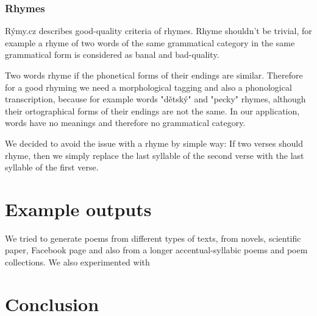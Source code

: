 \documentclass[a4]{article}
\begin{document}
\subsubsection{Rhymes}


Rýmy.cz\cite{rymy} describes good-quality criteria of rhymes. Rhyme
shouldn't be trivial, for example a rhyme of two words of the same
grammatical category in the same grammatical form is considered as banal
and bad-quality.

Two words rhyme if the phonetical forms of their endings are similar. 
Therefore for a good rhyming we need a morphological tagging and
also a phonological transcription, because for example words "dětský" and
"pecky" rhymes, although their ortographical forms of their endings are not
the same. In our application, words have no meanings and
therefore no grammatical category.

We decided to avoid the issue with a rhyme by simple way:
If two verses should rhyme, then we simply replace the last syllable of the
second verse with the last syllable of the first verse.

\section{Example outputs}

We tried to generate poems from different types of texts, from novels,
scientific paper, Facebook page and also from a longer accentual-syllabic poems and poem
collections. We also experimented with 

\section{Conclusion}
\end{document}

